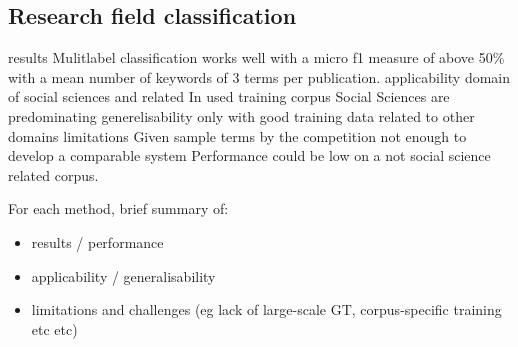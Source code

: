 \subsection{Research field classification}
results
    Mulitlabel classification works well with a  micro f1 measure of above 50\% with a mean number of keywords of 3 terms per publication.
applicability
    domain of social sciences and related
    In used training corpus Social Sciences are predominating
generelisability
    only with good training data related to other domains
limitations
    Given sample terms by the competition not enough to develop a comparable system
    Performance could be low on a not social science related corpus.

For each method, brief summary of:
\begin{itemize}
\item results / performance
\item applicability / generalisability
\item limitations and challenges (eg lack of large-scale GT, corpus-specific training etc etc)
\end{itemize}

